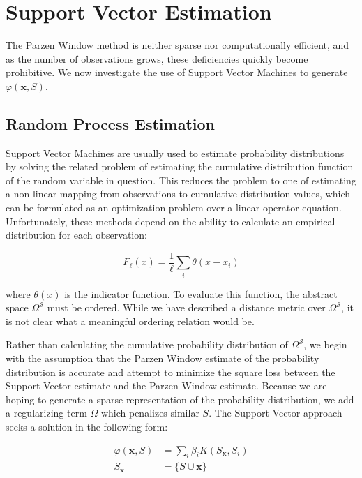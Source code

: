 \documentclass[10pt]{article}
\begin{document}
\section{ Support Vector Estimation}

The Parzen Window method is neither sparse nor computationally efficient, and as the number of observations grows, these deficiencies quickly become prohibitive.  We now investigate the use of Support Vector Machines to generate \( \varphi(\mathbf{x}, S) \).

\subsection{ Random Process Estimation }
Support Vector Machines are usually used to estimate probability distributions by solving the related problem of estimating the cumulative distribution function of the random variable in question.  This reduces the problem to one of estimating a non-linear mapping from observations to cumulative distribution values, which can be formulated as an optimization problem over a linear operator equation.  Unfortunately, these methods depend on the ability to calculate an empirical distribution for each observation:

\begin{equation} F_\ell(x) = \frac{1}{\ell} \sum_i \theta(x-x_i) \end{equation}

where \( \theta(x) \) is the indicator function.  To evaluate this function, the abstract space \( \Omega^\mathcal{S} \) must be ordered.  While we have described a distance metric over \( \Omega^\mathcal{S} \), it is not clear what a meaningful ordering relation would be.

Rather than calculating the cumulative probability distribution of \( \Omega^\mathcal{S} \), we begin with the assumption that the Parzen Window estimate of the probability distribution is accurate and attempt to minimize the square loss between the Support Vector estimate and the Parzen Window estimate.  Because we are hoping to generate a sparse representation of the probability distribution, we add a regularizing term \( \Omega \) which penalizes similar \( S \).  The Support Vector approach seeks a solution in the following form:

\begin{align} \label{eq:SVResultSingle}
\varphi( \mathbf{x}, S) &= \sum_{i} \beta_i K( S_\mathbf{x}, S_i ) \\
S_\mathbf{x} &= \{ S \cup \mathbf{x} \} \nonumber
\end{align}
\end{document}
